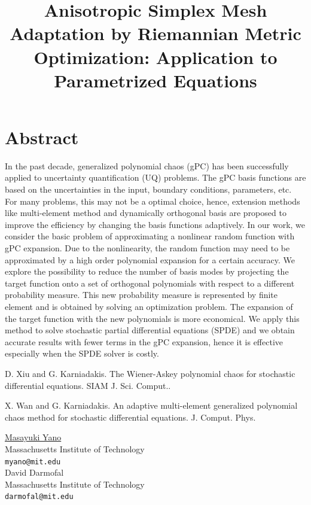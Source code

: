 \documentclass[article, A4, 11pt]{llncs}%
\begin{document}
\section*{Abstract}
In the past decade, generalized polynomial chaos (gPC) has been successfully applied to uncertainty quantification (UQ) problems. The gPC basis functions are based on the uncertainties in the input, boundary conditions, parameters, etc. For many problems, this may not be a optimal choice, hence, extension methods like multi-element method and dynamically orthogonal basis are proposed to improve the efficiency by changing the basis functions adaptively. In our work, we consider the basic problem of approximating a nonlinear random function with gPC expansion. Due to the nonlinearity, the random function may need to be approximated by a high order polynomial expansion for a certain accuracy. We explore the possibility to reduce the number of basis modes by projecting the target function onto a set of orthogonal polynomials with respect to a different probability measure. This new probability measure is represented by finite element and is obtained by solving an optimization problem. The expansion of the target function with the new polynomials is more economical. We apply this method to solve stochastic partial differential equations (SPDE) and we obtain accurate results with fewer terms in the gPC expansion, hence it is effective especially when the SPDE solver is costly.


\begin{thebibliography}{10}
{\sc D. Xiu and G. Karniadakis}. {The Wiener-Askey polynomial chaos for stochastic differential equations}. SIAM J. Sci. Comput..

{\sc X. Wan and G. Karniadakis}. {An adaptive multi-element generalized polynomial chaos method for stochastic differential equations}. J. Comput. Phys.
\end{thebibliography} %

\title{Anisotropic Simplex Mesh Adaptation by Riemannian Metric Optimization: Application to Parametrized Equations}
 \author{} \institute{}
\maketitle
\begin{center}
{\large \underline{Masayuki  Yano}}\\
Massachusetts Institute of Technology\\
{\tt myano@mit.edu}
\\ \vspace{4mm}
{\large David Darmofal}\\
Massachusetts Institute of Technology\\
{\tt darmofal@mit.edu}
\end{center}
\end{document}
